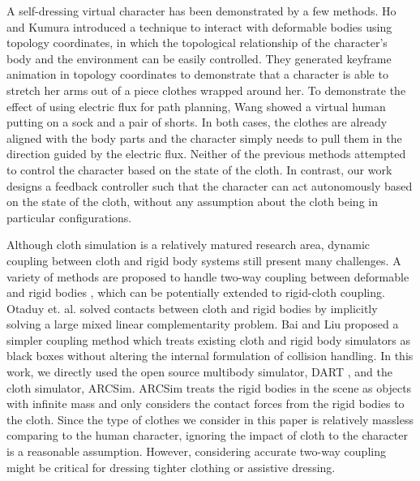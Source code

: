 A self-dressing virtual character has been demonstrated by a few methods. Ho and Kumura  introduced a technique to interact with deformable bodies using topology coordinates, in which the topological relationship of the character's body and the environment can be easily controlled. They generated keyframe animation in topology coordinates to demonstrate that a character is able to stretch her arms out of a piece clothes wrapped around her. To demonstrate the effect of using electric flux for path planning, Wang \etal {} showed a virtual human putting on a sock and a pair of shorts. In both cases, the clothes are already aligned with the body parts and the character simply needs to pull them in the direction guided by the electric flux. Neither of the previous methods attempted to control the character based on the state of the cloth. In contrast, our work designs a feedback controller such that the character can act autonomously based on the state of the cloth, without any assumption about the cloth being in particular configurations.


Although cloth simulation is a relatively matured research area, dynamic coupling between cloth and rigid body systems still present many challenges. A variety of methods are proposed to handle two-way coupling between deformable and rigid bodies \cite{Jansson:2003:CDR,Sifakis:2007:HSD,Shinar:2008:TCR,Otaduy:2009:ICH, Miguel and Otaduy 2011}, which can be potentially extended to rigid-cloth coupling. Otaduy et. al. \cite{Otaduy:2009:ICH} solved contacts between cloth and rigid bodies by implicitly solving a large mixed linear complementarity problem. Bai and Liu \cite{Bai:2014:CCR} proposed a simpler coupling method which treats existing cloth and rigid body simulators as black boxes without altering the internal formulation of collision handling. In this work, we directly used the open source multibody simulator, DART \cite{Liu:2012:STM}, and the cloth simulator, ARCSim\cite{Narain:2012:AAR,Narain:2013:FCA}. ARCSim treats the rigid bodies in the scene as objects with infinite mass and only considers the contact forces from the rigid bodies to the cloth. Since the type of clothes we consider in this paper is relatively massless comparing to the human character, ignoring the impact of cloth to the character is a reasonable assumption. However, considering accurate two-way coupling might be critical for dressing tighter clothing or assistive dressing.

